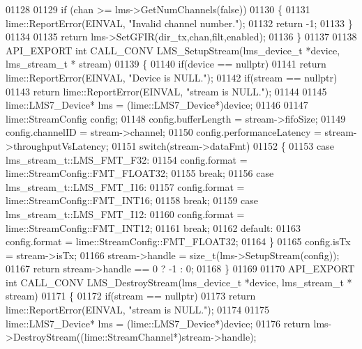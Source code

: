 \begin{DoxyCode}
01128 
01129     \textcolor{keywordflow}{if} (chan >= lms->GetNumChannels(\textcolor{keyword}{false}))
01130     \{
01131         lime::ReportError(EINVAL, \textcolor{stringliteral}{"Invalid channel number."});
01132         \textcolor{keywordflow}{return} -1;
01133     \}
01134 
01135     \textcolor{keywordflow}{return} lms->SetGFIR(dir\_tx,chan,filt,enabled);
01136 \}
01137 
01138 API_EXPORT \textcolor{keywordtype}{int} CALL_CONV LMS_SetupStream(lms_device_t *device, lms_stream_t *
      stream)
01139 \{
01140     \textcolor{keywordflow}{if}(device == \textcolor{keyword}{nullptr})
01141         \textcolor{keywordflow}{return} lime::ReportError(EINVAL, \textcolor{stringliteral}{"Device is NULL."});
01142     \textcolor{keywordflow}{if}(stream == \textcolor{keyword}{nullptr})
01143         \textcolor{keywordflow}{return} lime::ReportError(EINVAL, \textcolor{stringliteral}{"stream is NULL."});
01144 
01145     lime::LMS7_Device* lms = (lime::LMS7_Device*)device;
01146 
01147     lime::StreamConfig config;
01148     config.bufferLength = stream->fifoSize;
01149     config.channelID = stream->channel;
01150     config.performanceLatency = stream->throughputVsLatency;
01151     \textcolor{keywordflow}{switch}(stream->dataFmt)
01152     \{
01153         \textcolor{keywordflow}{case} lms_stream_t::LMS_FMT_F32:
01154             config.format = lime::StreamConfig::FMT_FLOAT32;
01155             \textcolor{keywordflow}{break};
01156         \textcolor{keywordflow}{case} lms_stream_t::LMS_FMT_I16:
01157             config.format = lime::StreamConfig::FMT_INT16;
01158             \textcolor{keywordflow}{break};
01159         \textcolor{keywordflow}{case} lms_stream_t::LMS_FMT_I12:
01160             config.format = lime::StreamConfig::FMT_INT12;
01161             \textcolor{keywordflow}{break};
01162         \textcolor{keywordflow}{default}:
01163             config.format = lime::StreamConfig::FMT_FLOAT32;
01164     \}
01165     config.isTx = stream->isTx;
01166     stream->handle = size\_t(lms->SetupStream(config));
01167     \textcolor{keywordflow}{return} stream->handle == 0 ? -1 : 0;
01168 \}
01169 
01170 API_EXPORT \textcolor{keywordtype}{int} CALL_CONV LMS_DestroyStream(lms_device_t *device, lms_stream_t *
      stream)
01171 \{
01172     \textcolor{keywordflow}{if}(stream == \textcolor{keyword}{nullptr})
01173         \textcolor{keywordflow}{return} lime::ReportError(EINVAL, \textcolor{stringliteral}{"stream is NULL."});
01174 
01175     lime::LMS7_Device* lms = (lime::LMS7_Device*)device;
01176     \textcolor{keywordflow}{return} lms->DestroyStream((lime::StreamChannel*)stream->handle);

\end{DoxyCode}
